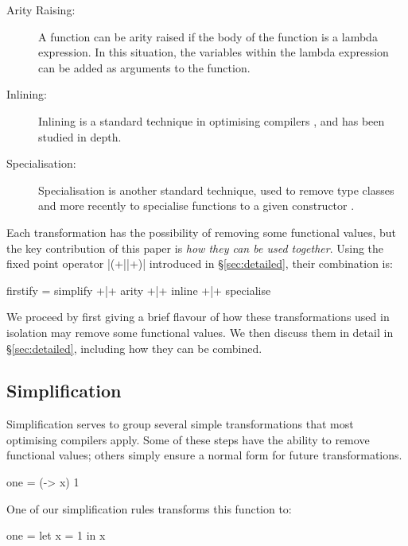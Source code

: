 \documentclass[preprint]{sigplanconf}
\begin{document}
\begin{description}
\item[Arity Raising:] A function can be arity raised if the body of the function is a lambda expression. In this situation, the variables within the lambda expression can be added as arguments to the function.
\item[Inlining:] Inlining is a standard technique in optimising compilers \cite{spj:inlining}, and has been studied in depth.
\item[Specialisation:] Specialisation is another standard technique, used to remove type classes \cite{jones:dictionary_free} and more recently to specialise functions to a given constructor \cite{spj:specconstr}.
\end{description}

Each transformation has the possibility of removing some functional values, but the key contribution of this paper is \textit{how they can be used together}. Using the fixed point operator |(+||+)| introduced in \S\ref{sec:detailed}, their combination is:

\begin{code}
firstify = simplify +|+ arity +|+ inline +|+ specialise
\end{code}

We proceed by first giving a brief flavour of how these transformations used in isolation may remove some functional values. We then discuss them in detail in \S\ref{sec:detailed}, including how they can be combined.

\subsection{Simplification}

Simplification serves to group several simple transformations that most optimising compilers apply. Some of these steps have the ability to remove functional values; others simply ensure a normal form for future transformations.

\begin{example}
\begin{code}
one = (\x -> x) 1
\end{code}

\noindent One of our simplification rules transforms this function to:

\begin{code}
one = let x = 1 in x
\end{code}
\end{example}
\end{document}
